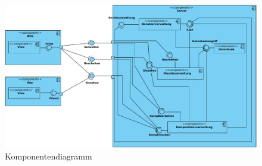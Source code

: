 \begin{figure}[h]
	\centering
	\includegraphics[width=\textwidth]{img/Diagramme/Komponenten}
	\caption{Komponentendiagramm}
	\label{fig:komponentendiagramm}
\end{figure}

